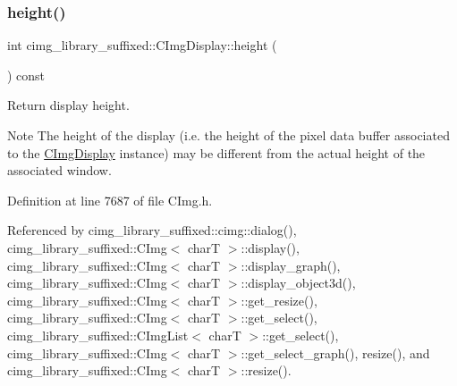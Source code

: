 \subsubsection{\texorpdfstring{height()}{height()}}
{\footnotesize\ttfamily int cimg\+\_\+library\+\_\+suffixed\+::\+C\+Img\+Display\+::height (\begin{DoxyParamCaption}{ }\end{DoxyParamCaption}) const\hspace{0.3cm}{\ttfamily [inline]}}



Return display height. 

\begin{DoxyNote}{Note}
The height of the display (i.\+e. the height of the pixel data buffer associated to the \hyperlink{structcimg__library__suffixed_1_1CImgDisplay}{C\+Img\+Display} instance) may be different from the actual height of the associated window. 
\end{DoxyNote}


Definition at line 7687 of file C\+Img.\+h.



Referenced by cimg\+\_\+library\+\_\+suffixed\+::cimg\+::dialog(), cimg\+\_\+library\+\_\+suffixed\+::\+C\+Img$<$ char\+T $>$\+::display(), cimg\+\_\+library\+\_\+suffixed\+::\+C\+Img$<$ char\+T $>$\+::display\+\_\+graph(), cimg\+\_\+library\+\_\+suffixed\+::\+C\+Img$<$ char\+T $>$\+::display\+\_\+object3d(), cimg\+\_\+library\+\_\+suffixed\+::\+C\+Img$<$ char\+T $>$\+::get\+\_\+resize(), cimg\+\_\+library\+\_\+suffixed\+::\+C\+Img$<$ char\+T $>$\+::get\+\_\+select(), cimg\+\_\+library\+\_\+suffixed\+::\+C\+Img\+List$<$ char\+T $>$\+::get\+\_\+select(), cimg\+\_\+library\+\_\+suffixed\+::\+C\+Img$<$ char\+T $>$\+::get\+\_\+select\+\_\+graph(), resize(), and cimg\+\_\+library\+\_\+suffixed\+::\+C\+Img$<$ char\+T $>$\+::resize().

